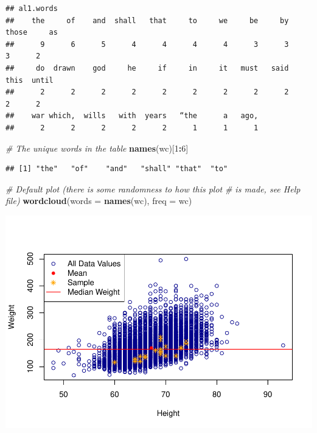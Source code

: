 \documentclass[
]{book}
\newenvironment{Shaded}{\begin{snugshade}}{\end{snugshade}}
\newcommand{\CommentTok}[1]{\textcolor[rgb]{0.56,0.35,0.01}{\textit{#1}}}
\newcommand{\DataTypeTok}[1]{\textcolor[rgb]{0.13,0.29,0.53}{#1}}
\newcommand{\DecValTok}[1]{\textcolor[rgb]{0.00,0.00,0.81}{#1}}
\newcommand{\KeywordTok}[1]{\textcolor[rgb]{0.13,0.29,0.53}{\textbf{#1}}}
\newcommand{\NormalTok}[1]{#1}
\newcommand{\OperatorTok}[1]{\textcolor[rgb]{0.81,0.36,0.00}{\textbf{#1}}}
\begin{document}
\begin{verbatim}
## al1.words
##    the     of    and  shall   that     to     we     be     by  those     as 
##      9      6      5      4      4      4      4      3      3      3      2 
##     do  drawn    god     he     if     in     it   must   said   this  until 
##      2      2      2      2      2      2      2      2      2      2      2 
##    war which,  wills   with  years   “the      a   ago, 
##      2      2      2      2      2      1      1      1
\end{verbatim}

\begin{Shaded}
\begin{Highlighting}[]
\CommentTok{# The unique words in the table}
\KeywordTok{names}\NormalTok{(wc)[}\DecValTok{1}\OperatorTok{:}\DecValTok{6}\NormalTok{]}
\end{Highlighting}
\end{Shaded}

\begin{verbatim}
## [1] "the"   "of"    "and"   "shall" "that"  "to"
\end{verbatim}

\begin{Shaded}
\begin{Highlighting}[]
\CommentTok{# Default plot (there is some randomness to how this plot}
\CommentTok{# is made, see Help file)}
\KeywordTok{wordcloud}\NormalTok{(}\DataTypeTok{words =} \KeywordTok{names}\NormalTok{(wc), }\DataTypeTok{freq =}\NormalTok{ wc)}
\end{Highlighting}
\end{Shaded}

\includegraphics{_main_files/figure-latex/unnamed-chunk-218-1.pdf}
\end{document}
